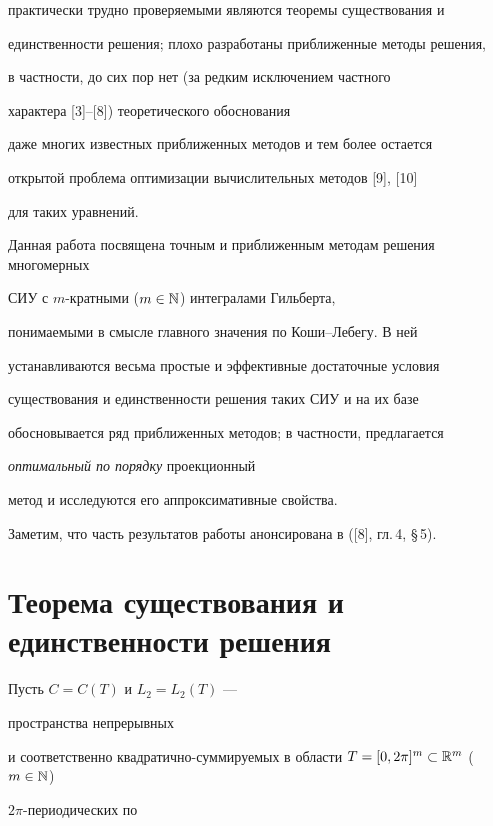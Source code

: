 практически трудно проверяемыми являются теоремы существования и


единственности решения; плохо разработаны приближенные методы решения,


в частности, до сих пор нет (за редким исключением частного


характера [3]--[8]) теоретического обоснования


даже многих известных приближенных методов и тем более остается


открытой проблема оптимизации вычислительных методов [9], [10]


для таких уравнений.





Данная работа посвящена точным и приближенным методам решения многомерных


СИУ с $m$-кратными ($m\in \Bbb{N}$) интегралами Гильберта,


понимаемыми в смысле главного значения по Коши--Лебегу. В ней


устанавливаются весьма простые и эффективные достаточные условия


существования и единственности решения таких СИУ и на их базе


обосновывается ряд приближенных методов; в частности, предлагается 


{\it оптимальный по порядку} проекционный


метод и исследуются его аппроксимативные свойства.





Заметим, что часть результатов работы анонсирована в ([8], гл.\,4, \S\,5).








\section{Теорема существования и единственности решения}





Пусть $C=C(T)$ и $L_2=L_2(T)$ ---


пространства непрерывных


и соответственно квадратично-суммируемых в области $T=[0,2\pi ]^m


\subset \Bbb{R}^m$ ($m\in \Bbb{N}$) 


$2\pi$-периодических по


